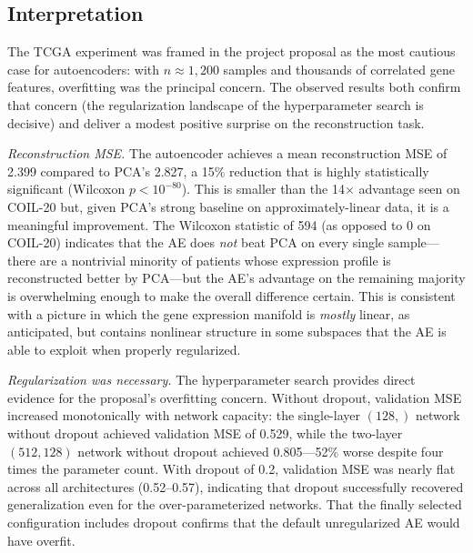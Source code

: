 \documentclass[11pt]{article}
\begin{document}
\subsection{Interpretation}

The TCGA experiment was framed in the project proposal as the most cautious case for autoencoders: with $n \approx 1{,}200$ samples and thousands of correlated gene features, overfitting was the principal concern. The observed results both confirm that concern (the regularization landscape of the hyperparameter search is decisive) and deliver a modest positive surprise on the reconstruction task.

\emph{Reconstruction MSE.} The autoencoder achieves a mean reconstruction MSE of 2.399 compared to PCA's 2.827, a 15\% reduction that is highly statistically significant (Wilcoxon $p < 10^{-80}$). This is smaller than the 14$\times$ advantage seen on COIL-20 but, given PCA's strong baseline on approximately-linear data, it is a meaningful improvement. The Wilcoxon statistic of 594 (as opposed to 0 on COIL-20) indicates that the AE does \emph{not} beat PCA on every single sample---there are a nontrivial minority of patients whose expression profile is reconstructed better by PCA---but the AE's advantage on the remaining majority is overwhelming enough to make the overall difference certain. This is consistent with a picture in which the gene expression manifold is \emph{mostly} linear, as anticipated, but contains nonlinear structure in some subspaces that the AE is able to exploit when properly regularized.

\emph{Regularization was necessary.} The hyperparameter search provides direct evidence for the proposal's overfitting concern. Without dropout, validation MSE increased monotonically with network capacity: the single-layer $(128,)$ network without dropout achieved validation MSE of 0.529, while the two-layer $(512, 128)$ network without dropout achieved 0.805---52\% worse despite four times the parameter count. With dropout of 0.2, validation MSE was nearly flat across all architectures (0.52--0.57), indicating that dropout successfully recovered generalization even for the over-parameterized networks. That the finally selected configuration includes dropout confirms that the default unregularized AE would have overfit.
\end{document}

